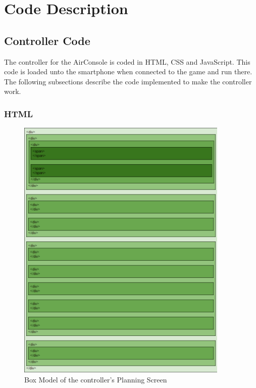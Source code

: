 \chapter{Code Description}\label{ch:codeDescription}
\section{Controller Code}\label{controllerCode}
The controller for the AirConsole is coded in HTML, CSS and JavaScript. This code is loaded unto the smartphone when connected to the game and run there. The following subsections describe the code implemented to make the controller work.

\subsection{HTML}\label{controllerHTML}

\begin{figure}[h!]
	\centering
	\includegraphics[width=0.9\textwidth]{figures/controller_box_model.png}
	\caption{Box Model of the controller's Planning Screen \label{fig:controllerBoxModel}}
\end{figure}


